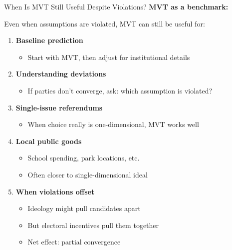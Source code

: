 \documentclass[10pt]{beamer}
\begin{document}
\begin{frame}{When Is MVT Still Useful Despite Violations?}
\textbf{MVT as a benchmark:}


Even when assumptions are violated, MVT can still be useful for:


\begin{enumerate}
\item \textbf{Baseline prediction}
\begin{itemize}
\item Start with MVT, then adjust for institutional details
\end{itemize}


\item \textbf{Understanding deviations}
\begin{itemize}
\item If parties don't converge, ask: which assumption is violated?
\end{itemize}


\item \textbf{Single-issue referendums}
\begin{itemize}
\item When choice really is one-dimensional, MVT works well
\end{itemize}


\item \textbf{Local public goods}
\begin{itemize}
\item School spending, park locations, etc.
\item Often closer to single-dimensional ideal
\end{itemize}


\item \textbf{When violations offset}
\begin{itemize}
\item Ideology might pull candidates apart
\item But electoral incentives pull them together
\item Net effect: partial convergence
\end{itemize}
\end{enumerate}
\end{frame}
\end{document}
